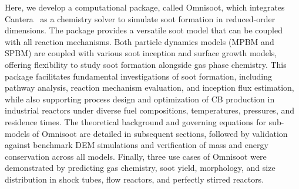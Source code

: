 Here, we develop a computational package, called Omnisoot, which integrates Cantera~\citep{cantera} as a chemistry solver to simulate soot formation in reduced-order dimensions. The package provides a versatile soot model that can be coupled with all reaction mechanisms. Both particle dynamics models (MPBM and SPBM) are coupled with various soot inception and surface growth models,  offering flexibility to study soot formation alongside gas phase chemistry. This package facilitates fundamental investigations of soot formation, including pathway analysis, reaction mechanism evaluation, and inception flux estimation, while also supporting process design and optimization of CB production in industrial reactors under diverse fuel compositions, temperatures, pressures, and residence times. The theoretical background and governing equations for sub-models of Omnisoot are detailed in subsequent sections, followed by validation against benchmark DEM simulations and verification of mass and energy conservation across all models. Finally, three use cases of Omnisoot were demonstrated by predicting gas chemistry, soot yield, morphology, and size distribution in shock tubes, flow reactors, and perfectly stirred reactors.






